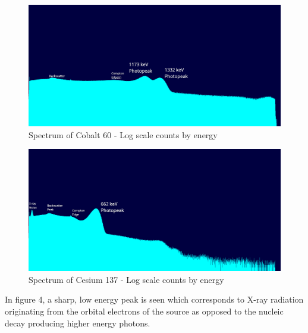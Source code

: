 \documentclass[12pt, a4paper]{article}
\begin{document}
	\begin{figure}[H] \centering
		\includegraphics[scale=0.3]{assets/co60_log_annotated.png}
		\caption{Spectrum of Cobalt 60 - Log scale counts by energy}
	\end{figure}
	\begin{figure}[H] \centering
		\includegraphics[scale=0.3]{assets/cs137_log_annotated.png}
		\caption{Spectrum of Cesium 137 - Log scale counts by energy}
	\end{figure}
In figure 4, a sharp, low energy peak is seen which corresponds to X-ray radiation originating from the orbital electrons of the source as opposed to the nucleic decay producing higher energy photons.
\end{document}
